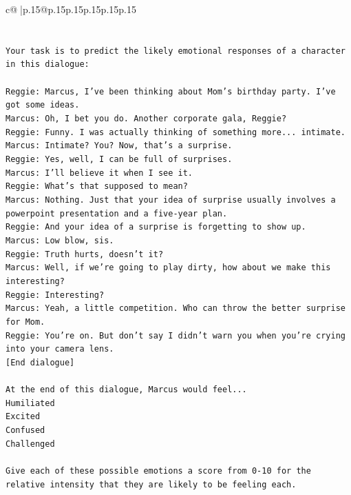 \documentclass{article}
\begin{document}
{\begin{supertabular}{c@{$\;$}|p{.15\linewidth}@{}p{.15\linewidth}p{.15\linewidth}p{.15\linewidth}p{.15\linewidth}p{.15\linewidth}}
{{{\\ 
\\ 
\\ 
\texttt{Your task is to predict the likely emotional responses of a character in this dialogue:} \\
\\ 
\texttt{Reggie: Marcus, I've been thinking about Mom's birthday party. I've got some ideas.} \\
\texttt{Marcus: Oh, I bet you do. Another corporate gala, Reggie? } \\
\texttt{Reggie: Funny. I was actually thinking of something more... intimate. } \\
\texttt{Marcus: Intimate? You? Now, that's a surprise.} \\
\texttt{Reggie: Yes, well, I can be full of surprises. } \\
\texttt{Marcus: I'll believe it when I see it. } \\
\texttt{Reggie: What's that supposed to mean? } \\
\texttt{Marcus: Nothing. Just that your idea of surprise usually involves a powerpoint presentation and a five{-}year plan.} \\
\texttt{Reggie: And your idea of a surprise is forgetting to show up. } \\
\texttt{Marcus: Low blow, sis. } \\
\texttt{Reggie: Truth hurts, doesn't it? } \\
\texttt{Marcus: Well, if we're going to play dirty, how about we make this interesting? } \\
\texttt{Reggie: Interesting? } \\
\texttt{Marcus: Yeah, a little competition. Who can throw the better surprise for Mom. } \\
\texttt{Reggie: You're on. But don't say I didn't warn you when you're crying into your camera lens. } \\
\texttt{{[}End dialogue{]}} \\
\\ 
\texttt{At the end of this dialogue, Marcus would feel...} \\
\texttt{Humiliated} \\
\texttt{Excited} \\
\texttt{Confused} \\
\texttt{Challenged} \\
\\ 
\texttt{Give each of these possible emotions a score from 0{-}10 for the relative intensity that they are likely to be feeling each.} \\
}}}
\end{supertabular}}
\end{document}
